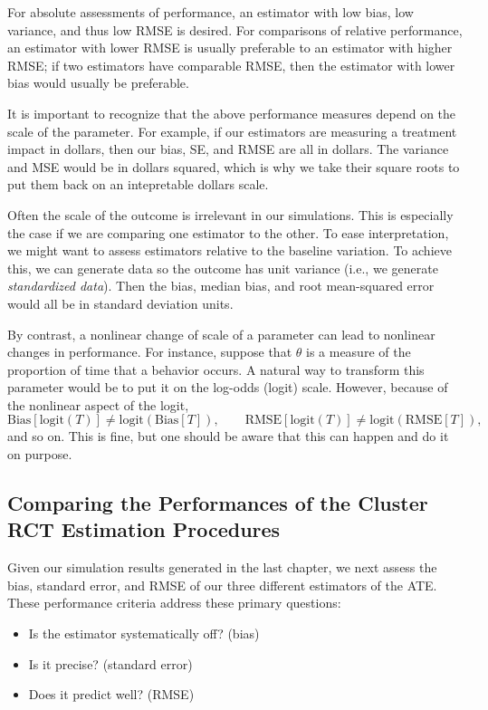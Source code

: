 \documentclass[
]{book}
\providecommand{\tightlist}{%
  \setlength{\itemsep}{0pt}\setlength{\parskip}{0pt}}
\begin{document}
For absolute assessments of performance, an estimator with low bias, low variance, and thus low RMSE is desired.
For comparisons of relative performance, an estimator with lower RMSE is usually preferable to an estimator with higher RMSE; if two estimators have comparable RMSE, then the estimator with lower bias would usually be preferable.

It is important to recognize that the above performance measures depend on the scale of the parameter.
For example, if our estimators are measuring a treatment impact in dollars, then our bias, SE, and RMSE are all in dollars.
The variance and MSE would be in dollars squared, which is why we take their square roots to put them back on an intepretable dollars scale.

Often the scale of the outcome is irrelevant in our simulations.
This is especially the case if we are comparing one estimator to the other.
To ease interpretation, we might want to assess estimators relative to the baseline variation.
To achieve this, we can generate data so the outcome has unit variance (i.e., we generate \emph{standardized data}).
Then the bias, median bias, and root mean-squared error would all be in standard deviation units.

By contrast, a nonlinear change of scale of a parameter can lead to nonlinear changes in performance.
For instance, suppose that \(\theta\) is a measure of the proportion of time that a behavior occurs.
A natural way to transform this parameter would be to put it on the log-odds (logit) scale.
However, because of the nonlinear aspect of the logit,
\[\text{Bias}\left[\text{logit}(T)\right] \neq \text{logit}\left(\text{Bias}[T]\right), \qquad \text{RMSE}\left[\text{logit}(T)\right] \neq \text{logit}\left(\text{RMSE}[T]\right),\]
and so on.
This is fine, but one should be aware that this can happen and do it on purpose.

\subsection{Comparing the Performances of the Cluster RCT Estimation Procedures}\label{comparing-the-performances-of-the-cluster-rct-estimation-procedures}

Given our simulation results generated in the last chapter, we next assess the bias, standard error, and RMSE of our three different estimators of the ATE.
These performance criteria address these primary questions:

\begin{itemize}
\tightlist
\item
  Is the estimator systematically off? (bias)
\item
  Is it precise? (standard error)
\item
  Does it predict well? (RMSE)
\end{itemize}
\end{document}
